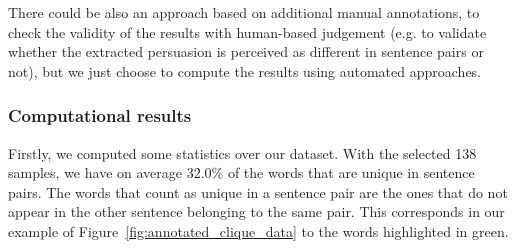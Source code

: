 There could be also an approach based on additional manual annotations, to check the validity of the results with human-based judgement (e.g. to validate whether the extracted persuasion is perceived as different in sentence pairs or not), but we just choose to compute the results using automated approaches.



\subsubsection{Computational results}
\label{ssec:lp_relationship_small_variations_quant}

Firstly, we computed some statistics over our dataset.
With the selected 138 samples, we have on average $32.0\%$ of the words that are unique in sentence pairs. The words that count as unique in a sentence pair are the ones that do not appear in the other sentence belonging to the same pair. This corresponds in our example of Figure~\ref{fig:annotated_clique_data} to the words highlighted in green.


